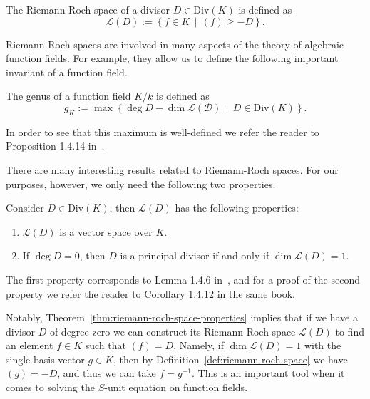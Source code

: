\begin{definition}%
  \label{def:riemann-roch-space}
  The Riemann-Roch space of a divisor \(D \in \mathrm{Div}(K)\) is defined as
  \[\mathcal{L}(D) := \left\{ f \in K \,\middle|\, (f) \geq -D \right\}.\]
\end{definition}

Riemann-Roch spaces are involved in many aspects of the theory of algebraic function fields. For example, they allow us to define the following important invariant of a function field.

\begin{definition}%
  \label{def:genus}
  The genus of a function field \(K / k\) is defined as
  \[g_{K} := \max{\left\{ \deg{D} - \dim{\mathcal{L(D)}} \,\middle|\, D \in \mathrm{Div}(K) \right\}}.\]
\end{definition}

In order to see that this maximum is well-defined we refer the reader to Proposition 1.4.14 in~\cite{stichtenoth-2009-algebraic-function-fields}.

There are many interesting results related to Riemann-Roch spaces. For our purposes, however, we only need the following two properties.

\begin{theorem}%
  \label{thm:riemann-roch-space-properties}
  Consider \(D \in \mathrm{Div}(K)\), then \(\mathcal{L}(D)\) has the following properties:
  \begin{enumerate}[label = {(\arabic*)}]
    \item%
      \label{prop:vector-space}
      \(\mathcal{L}(D)\) is a vector space over \(K\).

    \item%
      \label{prop:principal-dimension}
      If \(\deg{D} = 0\), then \(D\) is a principal divisor if and only if \(\dim{\mathcal{L}(D)} = 1\).
  \end{enumerate}
\end{theorem}

The first property corresponds to Lemma 1.4.6 in~\cite{stichtenoth-2009-algebraic-function-fields}, and for a proof of the second property we refer the reader to Corollary 1.4.12 in the same book.

Notably, Theorem~\ref{thm:riemann-roch-space-properties} implies that if we have a divisor \(D\) of degree zero we can construct its Riemann-Roch space \(\mathcal{L}(D)\) to find an element \(f \in K\) such that \((f) = D\). Namely, if \(\dim{\mathcal{L}(D)} = 1\) with the single basis vector \(g \in K\), then by Definition~\ref{def:riemann-roch-space} we have \((g) = -D\), and thus we can take \(f = g^{-1}\). This is an important tool when it comes to solving the \(S\)-unit equation on function fields.

